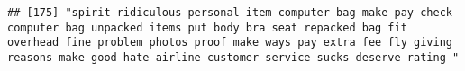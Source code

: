 \documentclass[
]{article}
\begin{document}
\begin{verbatim}
## [175] "spirit ridiculous personal item computer bag make pay check computer bag unpacked items put body bra seat repacked bag fit overhead fine problem photos proof make ways pay extra fee fly giving reasons make good hate airline customer service sucks deserve rating "                                                                                                                                                                                                                                                                                                                                                                                                                                                                                                                                                                                                                                                                                                                                                                                                                                                                                                                                                                                                                                                                                                                                                                                                                                                                                                                                                                                                                                                                                                                        

\end{verbatim}
\end{document}
